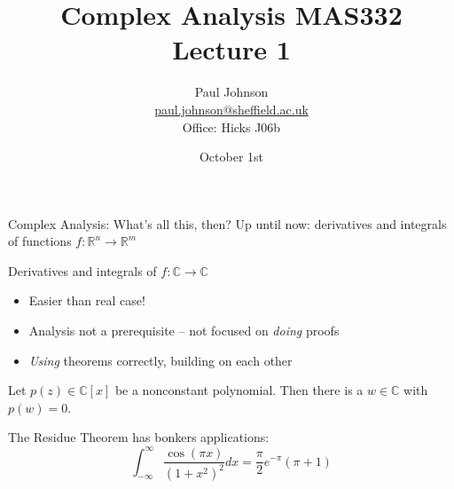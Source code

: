 \documentclass{beamer}
\title{Complex Analysis MAS332 \\ Lecture 1}
\author{Paul Johnson \\ \href{mailto:paul.johnson@sheffield.ac.uk}{paul.johnson@sheffield.ac.uk} \\ Office: Hicks J06b}
\date{October 1st}
\newcommand{\C}{\mathbb{C}}
\newcommand{\R}{\mathbb{R}}
\begin{document}
\maketitle

  \begin{frame}{Complex Analysis: What's all this, then?}
 Up until now: derivatives and integrals of functions $f:\R^n\to \R^m$

 \begin{block}{Derivatives and integrals of $f:\C\to\C$}
     \begin{itemize}
     \item Easier than real case!
     \item Analysis not a prerequisite -- not focused on \emph{doing} proofs
     \item \emph{Using} theorems correctly, building on each other
     \end{itemize}
 \end{block}
 
   \begin{theorem} Let $p(z)\in \C[x]$ be a nonconstant polynomial.  Then there is a $w\in\C$ with $p(w)=0$.
\end{theorem}

\begin{block}{The Residue Theorem has bonkers applications:}   
     $$\int_{-\infty}^\infty \frac{\cos(\pi x)}{(1+x^2)^2}dx=\frac{\pi}{2}e^{-\pi}(\pi+1)$$
\end{block}
 

  
  \end{frame}

    \begin{frame}[plain]
     \end{frame}
\end{document}
